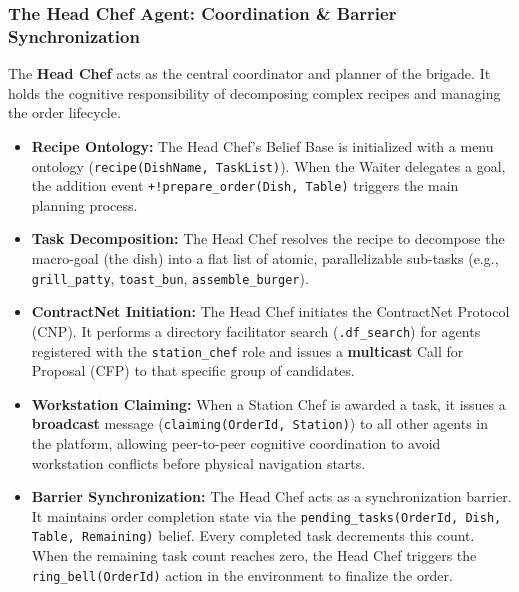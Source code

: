 \documentclass{scrartcl}
\begin{document}
\subsubsection{The Head Chef Agent: Coordination \& Barrier Synchronization}
The \textbf{Head Chef} acts as the central coordinator and planner of the brigade. It holds the cognitive responsibility of decomposing complex recipes and managing the order lifecycle.
\begin{itemize}
\item \textbf{Recipe Ontology:} The Head Chef's Belief Base is initialized with a menu ontology (\texttt{recipe(DishName, TaskList)}). When the Waiter delegates a goal, the addition event \texttt{+!prepare\_order(Dish, Table)} triggers the main planning process.
\item \textbf{Task Decomposition:} The Head Chef resolves the recipe to decompose the macro-goal (the dish) into a flat list of atomic, parallelizable sub-tasks (e.g., \texttt{grill\_patty}, \texttt{toast\_bun}, \texttt{assemble\_burger}).
\item \textbf{ContractNet Initiation:} The Head Chef initiates the ContractNet Protocol (CNP). It performs a directory facilitator search (\texttt{.df\_search}) for agents registered with the \texttt{station\_chef} role and issues a \textbf{multicast} Call for Proposal (CFP) to that specific group of candidates.
\item \textbf{Workstation Claiming:} When a Station Chef is awarded a task, it issues a \textbf{broadcast} message (\texttt{claiming(OrderId, Station)}) to all other agents in the platform, allowing peer-to-peer cognitive coordination to avoid workstation conflicts before physical navigation starts.
\item \textbf{Barrier Synchronization:} The Head Chef acts as a synchronization barrier. It maintains order completion state via the \texttt{pending\_tasks(OrderId, Dish, Table, Remaining)} belief. Every completed task decrements this count. When the remaining task count reaches zero, the Head Chef triggers the \texttt{ring\_bell(OrderId)} action in the environment to finalize the order.
\end{itemize}
\end{document}
